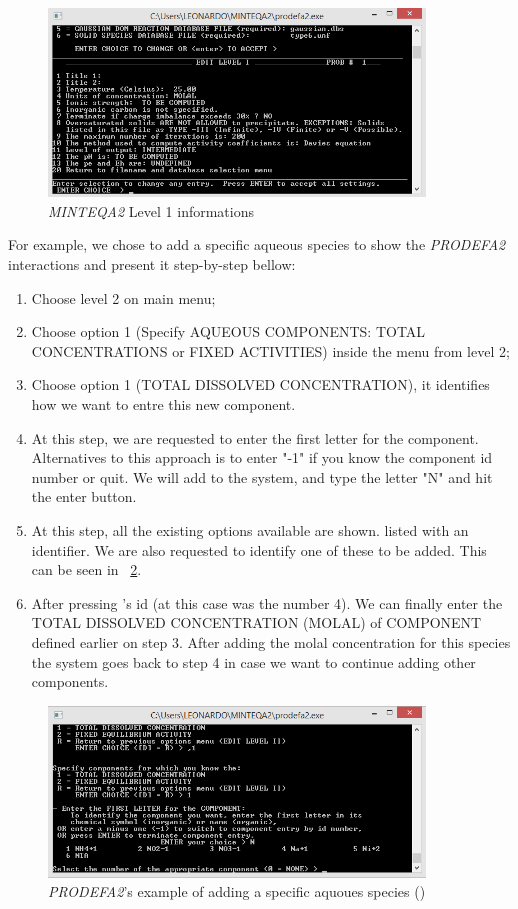 \begin{figure}[ht!]
\centering
\includegraphics[width=100mm]{figures/minteq-level1.png}
\caption{\emph{MINTEQA2} Level 1 informations}
\label{minteq:level1}
\end{figure}


For example, we chose to add a specific aqueous species to show the \emph{PRODEFA2} interactions and present it step-by-step bellow:

\begin{enumerate}
\item Choose level 2 on main menu;
\item Choose option 1 (Specify AQUEOUS COMPONENTS: TOTAL CONCENTRATIONS or FIXED ACTIVITIES) inside the menu from level 2;
\item Choose option 1 (TOTAL DISSOLVED CONCENTRATION), it identifies how we want to entre this new component.
\item At this step, we are requested to enter the first letter for the component. Alternatives to this approach is to enter "-1" if you know the component id number or quit. We will add  to the system, and type the letter "N" and hit the enter button.
\item At this step, all the existing options available are shown. listed with an identifier. We are also requested to identify one of these to be added. This can be seen in ~\ref{minteq:Na+}.
\item After pressing 's id (at this case was the number 4). We can finally enter the TOTAL DISSOLVED CONCENTRATION (MOLAL) of COMPONENT defined earlier on step 3. After adding the molal concentration for this species the system goes back to step 4 in case we want to continue adding other components.
\end{enumerate}

\begin{figure}[ht!]
\centering
\includegraphics[width=100mm]{figures/minteq-Na+.png}
\caption{\emph{PRODEFA2}'s example of adding a specific aquoues species () }
\label{minteq:Na+}
\end{figure}


